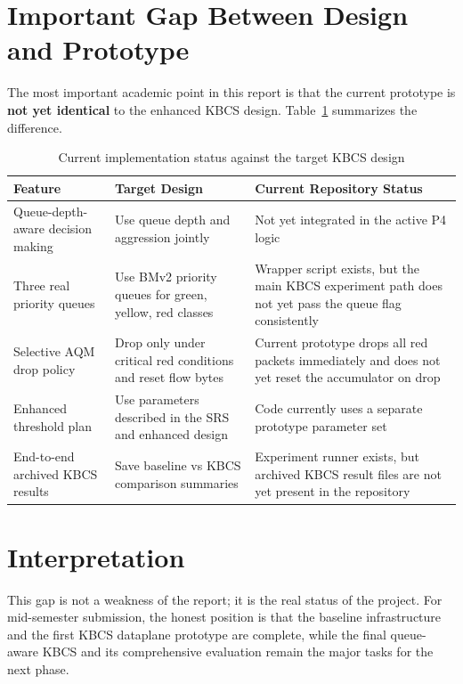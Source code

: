 \documentclass[12pt,a4paper]{report}
\begin{document}
\section{Important Gap Between Design and Prototype}
The most important academic point in this report is that the current prototype is \textbf{not yet identical} to the enhanced KBCS design. Table~\ref{tab:design_gap} summarizes the difference.

\begin{table}[H]
\centering
\caption{Current implementation status against the target KBCS design}
\label{tab:design_gap}
\renewcommand{\arraystretch}{1.35}
\begin{tabularx}{\textwidth}{@{}p{4.3cm}p{4.7cm}X@{}}
\toprule
\textbf{Feature} & \textbf{Target Design} & \textbf{Current Repository Status} \\
\midrule
Queue-depth-aware decision making & Use queue depth and aggression jointly & Not yet integrated in the active P4 logic \\
Three real priority queues & Use BMv2 priority queues for green, yellow, red classes & Wrapper script exists, but the main KBCS experiment path does not yet pass the queue flag consistently \\
Selective AQM drop policy & Drop only under critical red conditions and reset flow bytes & Current prototype drops all red packets immediately and does not yet reset the accumulator on drop \\
Enhanced threshold plan & Use parameters described in the SRS and enhanced design & Code currently uses a separate prototype parameter set \\
End-to-end archived KBCS results & Save baseline vs KBCS comparison summaries & Experiment runner exists, but archived KBCS result files are not yet present in the repository \\
\bottomrule
\end{tabularx}
\end{table}

\section{Interpretation}
This gap is not a weakness of the report; it is the real status of the project. For mid-semester submission, the honest position is that the baseline infrastructure and the first KBCS dataplane prototype are complete, while the final queue-aware KBCS and its comprehensive evaluation remain the major tasks for the next phase.
\end{document}
